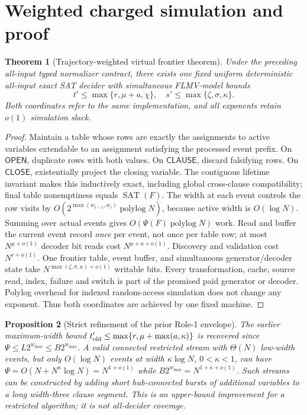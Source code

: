 \documentclass[11pt]{article}
\newtheorem{theorem}{Theorem}
\newtheorem{proposition}[theorem]{Proposition}
\begin{document}
\section{Weighted charged simulation and proof}
\begin{theorem}[Trajectory-weighted virtual frontier theorem]
Under the preceding all-input typed normalizer contract, there exists one fixed uniform deterministic all-input exact SAT decider with simultaneous FLMV-model bounds
\[
 \boxed{t'\le\max\{r,\mu+a,\chi\},\quad
 s'\le\max\{\zeta,\sigma,\kappa\}.}
 \tag{3}
\]
Both coordinates refer to the same implementation, and all exponents retain \(o(1)\) simulation slack.
\end{theorem}
\begin{proof}
Maintain a table whose rows are exactly the assignments to active variables extendable to an assignment satisfying the processed event prefix. On \(\mathsf{OPEN}\), duplicate rows with both values. On \(\mathsf{CLAUSE}\), discard falsifying rows. On \(\mathsf{CLOSE}\), existentially project the closing variable. The contiguous lifetime invariant makes this inductively exact, including global cross-clause compatibility; final table nonemptiness equals \(\operatorname{SAT}(F)\). The width at each event controls the row visits by \(O(2^{\max(w_{i-1},w_i)}\operatorname{polylog}N)\), because active width is \(O(\log N)\). Summing over actual events gives \(O(\Psi(F)\operatorname{polylog}N)\) work. Read and buffer the current event record \emph{once} per event, not once per table row; at most \(N^{\mu+o(1)}\) decoder bit reads cost \(N^{\mu+a+o(1)}\). Discovery and validation cost \(N^{r+o(1)}\). One frontier table, event buffer, and simultaneous generator/decoder state take \(N^{\max(\zeta,\sigma,\kappa)+o(1)}\) writable bits. Every transformation, cache, source read, index, failure and switch is part of the promised paid generator or decoder. Polylog overhead for indexed random-access simulation does not change any exponent. Thus both coordinates are achieved by one fixed machine.
\end{proof}

\begin{proposition}[Strict refinement of the prior Role-1 envelope]
The earlier maximum-width bound \(t'_{\rm old}\le\max\{r,\mu+\max(a,\kappa)\}\) is recovered since \(\Psi\le L2^{w_{\max}}\le B2^{w_{\max}}\). A valid connected restricted stream with \(\Theta(N)\) low-width events, but only \(O(\log N)\) events at width \(\kappa\log N\), \(0<\kappa<1\), can have \(\Psi=O(N+N^\kappa\log N)=N^{1+o(1)}\) while \(B2^{w_{\max}}=N^{1+\kappa+o(1)}\). Such streams can be constructed by adding short hub-connected bursts of additional variables to a long width-three clause segment. This is an upper-bound improvement for a restricted algorithm; it is \emph{not} all-decider coverage.
\end{proposition}
\end{document}
